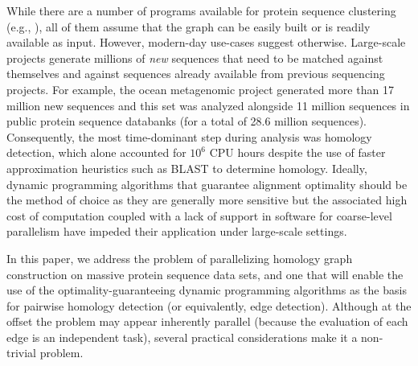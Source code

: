 \documentclass[10pt,journal,letterpaper,compsoc]{IEEEtran}
\begin{document}
While there are a number of programs available for protein sequence clustering (e.g., \cite{Apweiler04,Bateman04,Enright02,Kriventseva01,Olman07}), all of them assume that the graph can be easily built or is readily available as input. However, modern-day use-cases suggest otherwise. Large-scale projects generate millions of \emph{new} sequences that need to be matched against themselves and against sequences already available from previous sequencing projects. For example, the ocean metagenomic project generated more than 17 million new sequences and this set was analyzed alongside 11 million sequences in public protein sequence databanks (for a total of 28.6 million sequences). Consequently, the most time-dominant step during analysis was homology detection, which alone accounted for $10^6$ CPU hours despite the use of faster approximation heuristics such as BLAST \cite{Altschul90} to determine homology. Ideally, dynamic programming algorithms\cite{Needleman70,Smith81} that guarantee alignment optimality should be the method of choice as they are generally more sensitive but the associated high cost of computation coupled with a lack of support in software for coarse-level parallelism have impeded their application under large-scale settings.

In this paper, we address the problem of parallelizing homology graph construction on massive protein sequence data sets, and one that will enable the use of the optimality-guaranteeing dynamic programming algorithms as the basis for pairwise homology detection (or equivalently, edge detection). Although at the offset the problem may appear inherently parallel (because the evaluation of each edge is an independent task), several practical considerations make it a non-trivial problem.
\end{document}

